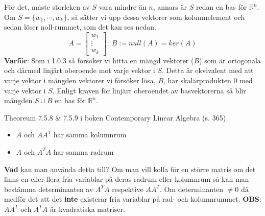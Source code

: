 \documentclass{report}
\begin{document}
{
För det, måste storleken av $ S $ vara mindre än $ n $, annars är $ S $ redan en bas för $ \mathbb{R}^n $. Om $ S = \{ w_1, \cdots, w_k\} $, så sätter vi upp dessa vektorer som kolumnelement och sedan löser noll-rummet, som det kan ses nedan.
\[
A =
\begin{bmatrix}
	w_1 \\
	\vdots \\
	w_k
\end{bmatrix}; \: B := null(A) = ker(A)
\]
\textbf{Varför}: Som i 1.0.3 så försöker vi hitta en mängd vektorer ($ B $) som är ortogonala och därmed linjärt oberoende mot varje vektor i $ S $. Detta är ekvivalent med att varje vektor i mängden vektorer vi försöker lösa, $ B $, har skalärprodukten 0 med varje vektor i $ S $. Enligt kraven för linjärt oberoendet av basvektorerna så blir mängden $ S \cup B $ en bas för $ \mathbb{R}^n $.  
}

{
Theoreum 7.5.8 \& 7.5.9 i boken Contemporary Linear Algebra (s. 365)
\begin{itemize}
	\item $A$ och $A A^T$ har samma kolumnrum
	\item $A$ och $A^T A$ har samma radrum
\end{itemize}
\textbf{Vad} kan man använda detta till? Om man vill kolla för en större matris om det finns en eller flera fria variablar på deras radrum eller kolumnrum så kan man bestämma determinanten av $A^T A$ respektive $A A^T$. Om determinanten $ \ne 0$ då medför det att det \textbf{inte} existerar fria variablar på rad- och kolumnrummet. \textbf{OBS}: $A A^T$ och $A^T A$ är kvadratiska matriser.  
}
\end{document}
